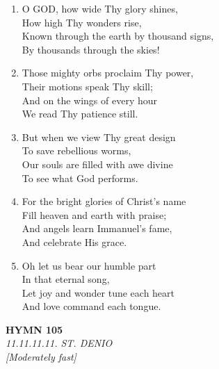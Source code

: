\documentclass[11pt,a4paper]{article}
\begin{document}
\begin{enumerate}
    \item O GOD, how wide Thy glory shines, \\
        How high Thy wonders rise, \\
        Known through the earth by thousand signs, \\
        By thousands through the skies!

    \item Those mighty orbs proclaim Thy power, \\
        Their motions speak Thy skill; \\
        And on the wings of every hour \\
        We read Thy patience still.

    \item But when we view Thy great design \\
        To save rebellious worms, \\
        Our souls are filled with awe divine \\
        To see what God performs.

    \item For the bright glories of Christ's name \\
        Fill heaven and earth with praise; \\
        And angels learn Immanuel's fame, \\
        And celebrate His grace.

    \item Oh let us bear our humble part \\
        In that eternal song, \\
        Let joy and wonder tune each heart \\
        And love command each tongue.

\end{enumerate}

\newpage
\begin{center}
    {\Large \textbf{HYMN 105}}
    \\
    \textit{11.11.11.11. ST. DENIO}
    \\
    \textit{\small [Moderately fast]}
\end{center}
\vspace{1em}
\end{document}
